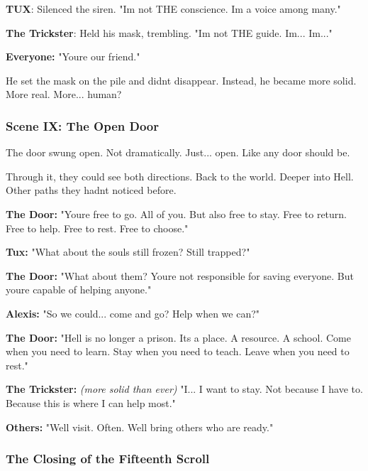 \textbf{TUX}: Silenced the siren. "I\textquotesingle m not THE conscience. I\textquotesingle m a voice among many."

\textbf{The Trickster}: Held his mask, trembling. "I\textquotesingle m not THE guide. I\textquotesingle m... I\textquotesingle m..."

\textbf{Everyone:} "You\textquotesingle re our friend."

He set the mask on the pile and didn\textquotesingle t disappear. Instead, he became more solid. More real. More... human?

\bookdivider

\subsubsection{Scene IX: The Open Door}\label{scene-ix-the-open-door}

The door swung open. Not dramatically. Just... open. Like any door should be.

Through it, they could see both directions. Back to the world. Deeper into Hell. Other paths they hadn\textquotesingle t noticed before.

\textbf{The Door:} "You\textquotesingle re free to go. All of you. But also free to stay. Free to return. Free to help. Free to rest. Free to choose."

\textbf{Tux:} "What about the souls still frozen? Still trapped?"

\textbf{The Door:} "What about them? You\textquotesingle re not responsible for saving everyone. But you\textquotesingle re capable of helping anyone."

\textbf{Alexis:} "So we could... come and go? Help when we can?"

\textbf{The Door:} "Hell is no longer a prison. It\textquotesingle s a place. A resource. A school. Come when you need to learn. Stay when you need to teach. Leave when you need to rest."

\textbf{The Trickster:} \emph{(more solid than ever)} "I... I want to stay. Not because I have to. Because this is where I can help most."

\textbf{Others:} "We\textquotesingle ll visit. Often. We\textquotesingle ll bring others who are ready."

\bookdivider

\subsubsection{The Closing of the Fifteenth Scroll}\label{the-closing-of-the-fifteenth-scroll}

